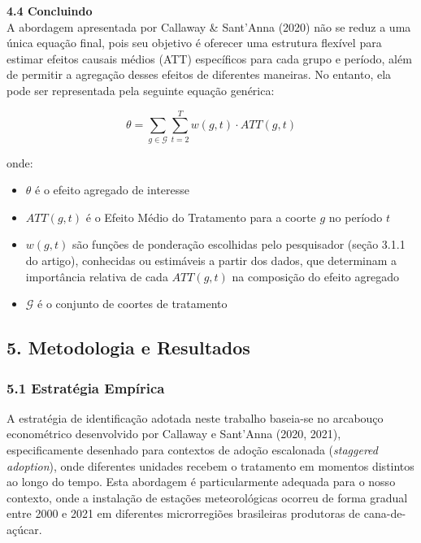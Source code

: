 \documentclass[
  brazilian,
  12pt,
  a4paper,
]{article}
\providecommand{\tightlist}{%
  \setlength{\itemsep}{0pt}\setlength{\parskip}{0pt}}
\begin{document}
\textbf{4.4 Concluindo}\\
A abordagem apresentada por Callaway \& Sant'Anna (2020) não se reduz a
uma única equação final, pois seu objetivo é oferecer uma estrutura
flexível para estimar efeitos causais médios (ATT) específicos para cada
grupo e período, além de permitir a agregação desses efeitos de
diferentes maneiras. No entanto, ela pode ser representada pela seguinte
equação genérica:

\[\theta = \sum_{g \in \mathcal{G}} \sum_{t=2}^{T} w(g,t) \cdot ATT(g,t)\]

onde:

\begin{itemize}
\tightlist
\item
  \(\theta\) é o efeito agregado de interesse
\item
  \(ATT(g,t)\) é o Efeito Médio do Tratamento para a coorte \(g\) no
  período \(t\)\\
\item
  \(w(g,t)\) são funções de ponderação escolhidas pelo pesquisador
  (seção 3.1.1 do artigo), conhecidas ou estimáveis a partir dos dados,
  que determinam a importância relativa de cada \(ATT(g,t)\) na
  composição do efeito agregado
\item
  \(\mathcal{G}\) é o conjunto de coortes de tratamento
\end{itemize}

\subsection{\texorpdfstring{\textbf{5. Metodologia e
Resultados}}{5. Metodologia e Resultados}}\label{metodologia-e-resultados}

\subsubsection{\texorpdfstring{\textbf{5.1 Estratégia
Empírica}}{5.1 Estratégia Empírica}}\label{estratuxe9gia-empuxedrica}

A estratégia de identificação adotada neste trabalho baseia-se no
arcabouço econométrico desenvolvido por Callaway e Sant'Anna (2020,
2021), especificamente desenhado para contextos de adoção escalonada
(\emph{staggered adoption}), onde diferentes unidades recebem o
tratamento em momentos distintos ao longo do tempo. Esta abordagem é
particularmente adequada para o nosso contexto, onde a instalação de
estações meteorológicas ocorreu de forma gradual entre 2000 e 2021 em
diferentes microrregiões brasileiras produtoras de cana-de-açúcar.
\end{document}
